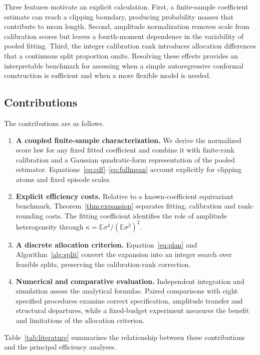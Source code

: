 \documentclass[nolineno]{ieeeaccess}
\newcommand{\E}{\mathbb{E}}
\begin{document}
Three features motivate an explicit calculation. First, a finite-sample coefficient estimate can reach a clipping boundary, producing probability masses that contribute to mean length. Second, amplitude normalization removes scale from calibration scores but leaves a fourth-moment dependence in the variability of pooled fitting. Third, the integer calibration rank introduces allocation differences that a continuous split proportion omits. Resolving these effects provides an interpretable benchmark for assessing when a simple autoregressive conformal construction is sufficient and when a more flexible model is needed.

\subsection{Contributions}
The contributions are as follows.
\begin{enumerate}[leftmargin=*,itemsep=3pt]
\item \textbf{A coupled finite-sample characterization.} We derive the normalized score law for any fixed fitted coefficient and combine it with finite-rank calibration and a Gaussian quadratic-form representation of the pooled estimator. Equations~\eqref{eq:cdf}--\eqref{eq:fullmean} account explicitly for clipping atoms and fixed episode scales.
\item \textbf{Explicit efficiency costs.} Relative to a known-coefficient equivariant benchmark, Theorem~\ref{thm:expansion} separates fitting, calibration and rank-rounding costs. The fitting coefficient identifies the role of amplitude heterogeneity through $\kappa=\E\sigma^4/(\E\sigma^2)^2$.
\item \textbf{A discrete allocation criterion.} Equation~\eqref{eq:plan} and Algorithm~\ref{alg:split} convert the expansion into an integer search over feasible splits, preserving the calibration-rank correction.
\item \textbf{Numerical and comparative evaluation.} Independent integration and simulation assess the analytical formulas. Paired comparisons with eight specified procedures examine correct specification, amplitude transfer and structural departures, while a fixed-budget experiment measures the benefit and limitations of the allocation criterion.
\end{enumerate}
Table~\ref{tab:literature} summarizes the relationship between these contributions and the principal efficiency analyses.
\end{document}
